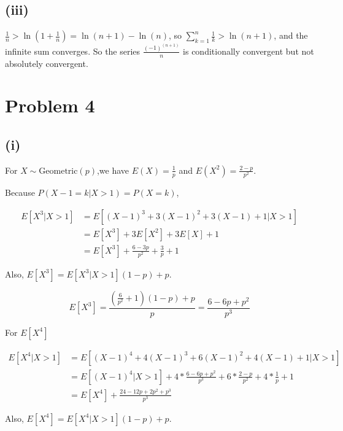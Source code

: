 \documentclass{article}
\begin{document}
\subsection{(iii)}
 
 $\frac 1 n > \ln (1+\frac 1 n) = \ln(n+1) - \ln(n)$, so $\sum_{k=1}^n \frac 1 k  > \ln(n+1)$, and the infinite sum converges. So the series $\frac{(-1)^{(n+1)}}{n}$ is conditionally convergent but not absolutely convergent.

\section{Problem 4}

\subsection{(i)}

For $X\sim\text{Geometric}(p)$,we have $E(X) = \frac {1} {p}$ and $E(X^2) = \frac {2-p}{p^2}$. 

Because $P(X-1=k |X>1) = P(X=k)$, 

\begin{equation}
    \begin{aligned}
        E[X^3|X>1] & = E[(X-1)^3+3(X-1)^2+3(X-1)+1 | X>1] \\
        & = E[X^3] + 3 E[X^2] + 3E[X] + 1 \\
        & = E[X^3] + \frac {6-3p}{p^2} + \frac {3} {p} +1
    \end{aligned}
\end{equation}

Also, $E[X^3] = E[X^3|X>1](1-p) + p$.

\begin{equation}
    E[X^3] = \frac{(\frac{6}{p^2}+1)(1-p)+p}{p} = \frac {6-6p+p^2} {p^3}
\end{equation}

For $E[X^4]$

\begin{equation}
    \begin{aligned}
        E[X^4 | X>1] & = E[(X-1)^4+4(X-1)^3 + 6(X-1)^2 + 4(X-1) +1  | X>1] \\
        & = E[(X-1)^4|X>1]+4 *\frac {6-6p+p^2} {p^3} + 6* \frac {2-p}{p^2} +  4 *\frac {1} {p} + 1 \\
        & = E[X^4] + \frac{24-12p+2p^2+p^3}{p^3} 
    \end{aligned}
\end{equation}

Also, $E[X^4] = E[X^4|X>1](1-p) + p$.
\end{document}
